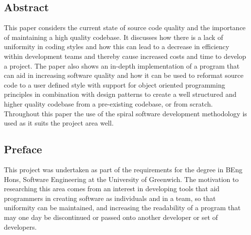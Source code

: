 \subsection*{Abstract}
This paper considers the current state of source code quality and the importance of maintaining a high quality codebase. It discusses how there is a lack of uniformity in coding styles and how this can lead to a decrease in efficiency within development teams and thereby cause increased costs and time to develop a project. The paper also shows an in-depth implementation of a program that can aid in increasing software quality and how it can be used to reformat source code to a user defined style with support for object oriented programming principles in combination with design patterns to create a well structured and higher quality codebase from a pre-existing codebase, or from scratch. Throughout this paper the use of the spiral software development methodology is used as it suits the project area well.

\subsection*{Preface}
This project was undertaken as part of the requirements for the degree in BEng Hons, Software Engineering at the University of Greenwich. The motivation to researching this area comes from an interest in developing tools that aid programmers in creating software as individuals and in a team, so that uniformity can be maintained, and increasing the readability of a program that may one day be discontinued or passed onto another developer or set of developers.
